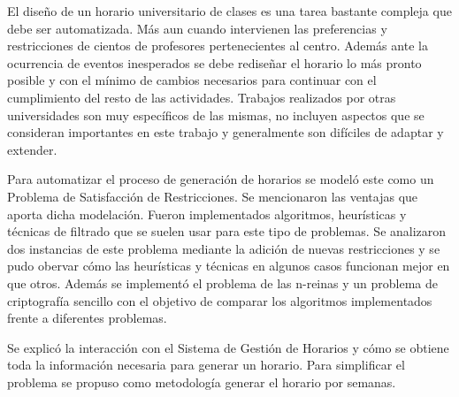 \begin{conclusions}

El diseño de un horario universitario de clases es una tarea bastante compleja que debe ser automatizada. M\'as aun cuando intervienen las preferencias y restricciones de cientos de profesores pertenecientes al centro. Adem\'as ante la ocurrencia de eventos inesperados se debe rediseñar el horario lo m\'as pronto posible y con el m\'inimo de cambios necesarios para continuar con el cumplimiento del resto de las actividades. Trabajos realizados por otras universidades son muy espec\'ificos de las mismas, no incluyen aspectos que se consideran importantes en este trabajo y generalmente son dif\'iciles de adaptar y extender.

Para automatizar el proceso de generaci\'on de horarios se model\'o este como un Problema de Satisfacci\'on de Restricciones. Se mencionaron las ventajas que aporta dicha modelaci\'on. Fueron implementados algoritmos, heur\'isticas y t\'ecnicas de filtrado que se suelen usar para este tipo de problemas. Se analizaron dos instancias de este problema mediante la adici\'on de nuevas restricciones y se pudo obervar c\'omo las heur\'isticas y t\'ecnicas en algunos casos funcionan mejor en que otros. Adem\'as se implement\'o el problema de las n-reinas y un problema de criptograf\'ia sencillo con el objetivo de comparar los algoritmos implementados frente a diferentes problemas.

Se explic\'o la interacci\'on con el Sistema de Gesti\'on de Horarios y c\'omo se obtiene toda la informaci\'on necesaria para generar un horario. Para simplificar el problema se propuso como metodolog\'ia generar el horario por semanas.

\end{conclusions}